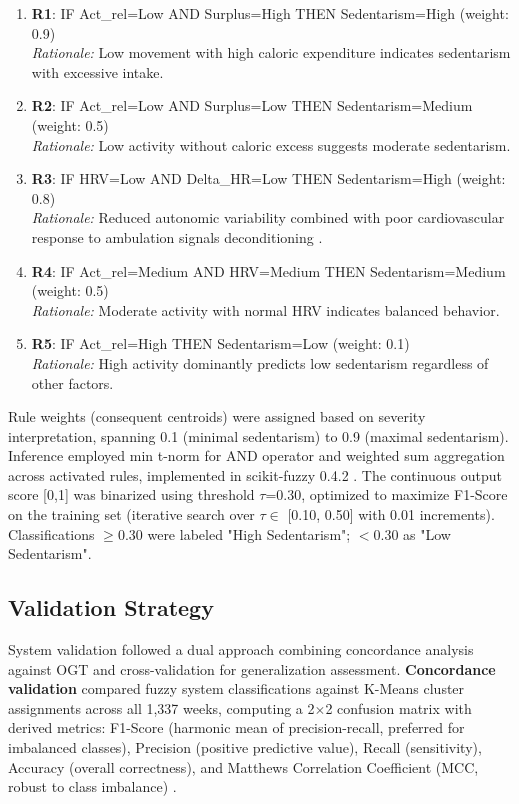 \documentclass[journal,twoside,web]{ieeecolor}
\begin{document}
\begin{enumerate}
\item \textbf{R1}: IF Act\_rel=Low AND Surplus=High THEN Sedentarism=High (weight: 0.9) \\ \textit{Rationale:} Low movement with high caloric expenditure indicates sedentarism with excessive intake.

\item \textbf{R2}: IF Act\_rel=Low AND Surplus=Low THEN Sedentarism=Medium (weight: 0.5) \\ \textit{Rationale:} Low activity without caloric excess suggests moderate sedentarism.

\item \textbf{R3}: IF HRV=Low AND Delta\_HR=Low THEN Sedentarism=High (weight: 0.8) \\ \textit{Rationale:} Reduced autonomic variability combined with poor cardiovascular response to ambulation signals deconditioning \cite{Thayer2009,Shaffer2017}.

\item \textbf{R4}: IF Act\_rel=Medium AND HRV=Medium THEN Sedentarism=Medium (weight: 0.5) \\ \textit{Rationale:} Moderate activity with normal HRV indicates balanced behavior.

\item \textbf{R5}: IF Act\_rel=High THEN Sedentarism=Low (weight: 0.1) \\ \textit{Rationale:} High activity dominantly predicts low sedentarism regardless of other factors.
\end{enumerate}

Rule weights (consequent centroids) were assigned based on severity interpretation, spanning 0.1 (minimal sedentarism) to 0.9 (maximal sedentarism). Inference employed min t-norm for AND operator and weighted sum aggregation across activated rules, implemented in scikit-fuzzy 0.4.2 \cite{Zadeh1965}. The continuous output score [0,1] was binarized using threshold $\tau$=0.30, optimized to maximize F1-Score on the training set (iterative search over $\tau \in$ [0.10, 0.50] with 0.01 increments). Classifications $\geq$0.30 were labeled "High Sedentarism"; $<$0.30 as "Low Sedentarism".

\subsection{Validation Strategy}
\label{subsec:validation}

System validation followed a dual approach combining concordance analysis against OGT and cross-validation for generalization assessment. \textbf{Concordance validation} compared fuzzy system classifications against K-Means cluster assignments across all 1,337 weeks, computing a 2$\times$2 confusion matrix with derived metrics: F1-Score (harmonic mean of precision-recall, preferred for imbalanced classes), Precision (positive predictive value), Recall (sensitivity), Accuracy (overall correctness), and Matthews Correlation Coefficient (MCC, robust to class imbalance) \cite{Chicco2020,Powers2020}.
\end{document}
